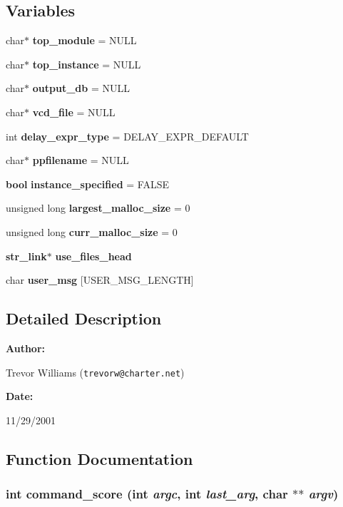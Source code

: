 \subsection*{Variables}
\begin{CompactItemize}
\item 
char$\ast$ {\bf top\_\-module} = NULL
\item 
char$\ast$ {\bf top\_\-instance} = NULL
\item 
char$\ast$ {\bf output\_\-db} = NULL
\item 
char$\ast$ {\bf vcd\_\-file} = NULL
\item 
int {\bf delay\_\-expr\_\-type} = DELAY\_\-EXPR\_\-DEFAULT
\item 
char$\ast$ {\bf ppfilename} = NULL
\item 
{\bf bool} {\bf instance\_\-specified} = FALSE
\item 
unsigned long {\bf largest\_\-malloc\_\-size} = 0
\item 
unsigned long {\bf curr\_\-malloc\_\-size} = 0
\item 
{\bf str\_\-link}$\ast$ {\bf use\_\-files\_\-head}
\item 
char {\bf user\_\-msg} [USER\_\-MSG\_\-LENGTH]
\end{CompactItemize}


\subsection{Detailed Description}


\begin{Desc}
\item[{\bf Author: }]\par
Trevor Williams ({\tt trevorw@charter.net}) \end{Desc}
\begin{Desc}
\item[{\bf Date: }]\par
11/29/2001

\end{Desc}


\subsection{Function Documentation}
\subsubsection{\setlength{\rightskip}{0pt plus 5cm}int command\_\-score (int {\em argc}, int {\em last\_\-arg}, char $\ast$$\ast$ {\em argv})}\label{score_8c_a15}


